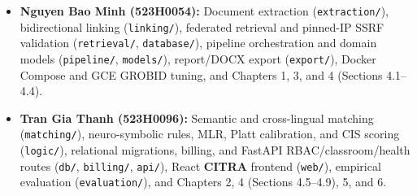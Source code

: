 {\setlength{\itemsep}{2pt}
\begin{itemize}
    \item \textbf{Nguyen Bao Minh (523H0054):} Document extraction (\texttt{extraction/}), bidirectional linking (\texttt{linking/}), federated retrieval and pinned-IP SSRF validation (\texttt{retrieval/}, \texttt{database/}), pipeline orchestration and domain models (\texttt{pipeline/}, \texttt{models/}), report/DOCX export (\texttt{export/}), Docker Compose and GCE GROBID tuning, and Chapters 1, 3, and 4 (Sections 4.1--4.4).
    \item \textbf{Tran Gia Thanh (523H0096):} Semantic and cross-lingual matching (\texttt{matching/}), neuro-symbolic rules, MLR, Platt calibration, and CIS scoring (\texttt{logic/}), relational migrations, billing, and FastAPI RBAC/classroom/health routes (\texttt{db/}, \texttt{billing/}, \texttt{api/}), React \textbf{CITRA} frontend (\texttt{web/}), empirical evaluation (\texttt{evaluation/}), and Chapters 2, 4 (Sections 4.5--4.9), 5, and 6.
\end{itemize}}
